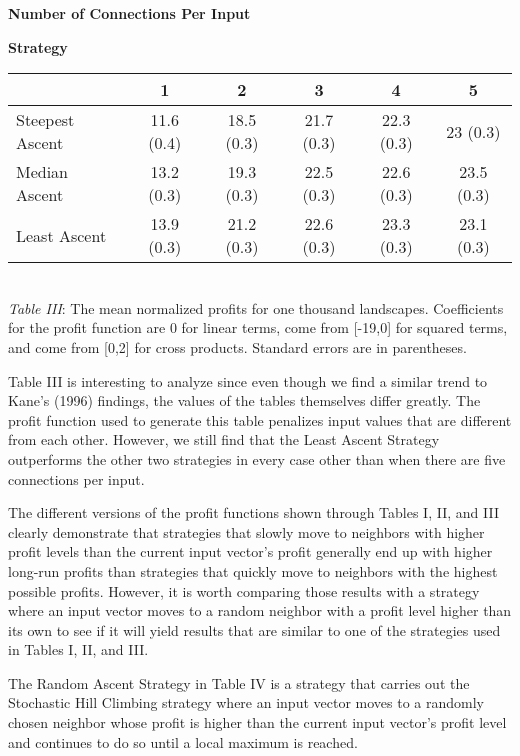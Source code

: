 \begin{center}
\hspace{2cm} \textbf{Number of Connections Per Input}
\begin{flushleft}
\hspace{2.5cm} \textbf{Strategy}
\end{flushleft}
\begin{Schunk}

\begin{tabular}{l|c|c|c|c|c}
\hline
  & 1 & 2 & 3 & 4 & 5\\
\hline
Steepest Ascent & 11.6 (0.4) & 18.5 (0.3) & 21.7 (0.3) & 22.3 (0.3) & 23 (0.3)\\
\hline
Median Ascent & 13.2 (0.3) & 19.3 (0.3) & 22.5 (0.3) & 22.6 (0.3) & 23.5 (0.3)\\
\hline
Least Ascent & 13.9 (0.3) & 21.2 (0.3) & 22.6 (0.3) & 23.3 (0.3) & 23.1 (0.3)\\
\hline
\end{tabular}

\end{Schunk}
\\
\emph{Table III}: The mean normalized profits for one thousand landscapes. Coefficients for the profit function are 0 for linear terms, come from [-19,0] for squared terms, and come from [0,2] for cross products. Standard errors are in parentheses.
\end{center}

Table III is interesting to analyze since even though we find a similar
trend to Kane's (1996) findings, the values of the tables themselves
differ greatly. The profit function used to generate this table
penalizes input values that are different from each other. However, we
still find that the Least Ascent Strategy outperforms the other two
strategies in every case other than when there are five connections per
input.

The different versions of the profit functions shown through Tables I,
II, and III clearly demonstrate that strategies that slowly move to
neighbors with higher profit levels than the current input vector's
profit generally end up with higher long-run profits than strategies
that quickly move to neighbors with the highest possible profits.
However, it is worth comparing those results with a strategy where an
input vector moves to a random neighbor with a profit level higher than
its own to see if it will yield results that are similar to one of the
strategies used in Tables I, II, and III.

The Random Ascent Strategy in Table IV is a strategy that carries out
the Stochastic Hill Climbing strategy where an input vector moves to a
randomly chosen neighbor whose profit is higher than the current input
vector's profit level and continues to do so until a local maximum is
reached.

